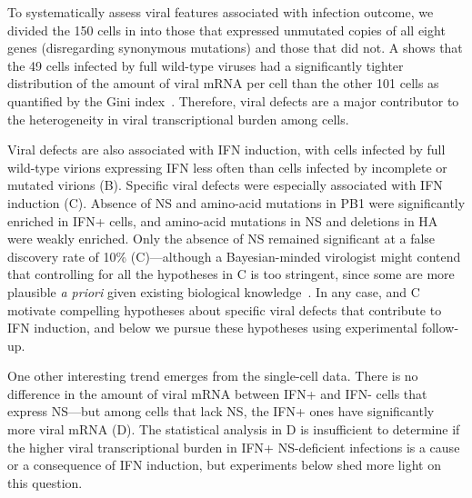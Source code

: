 \documentclass[9pt,lineno]{elife}
\begin{document}
\begin{figure}
\begin{fullwidth}
\label{figdata:mutations}

\end{fullwidth}
\end{figure}

To systematically assess viral features associated with infection outcome, we divided the 150 cells in  into those that expressed unmutated copies of all eight genes (disregarding synonymous mutations) and those that did not.
A shows that the 49 cells infected by full wild-type viruses had a significantly tighter distribution of the amount of viral mRNA per cell than the other 101 cells as quantified by the Gini index~\citep{gini1921measurement}.
Therefore, viral defects are a major contributor to the heterogeneity in viral transcriptional burden among cells.

Viral defects are also associated with IFN induction, with cells infected by full wild-type virions expressing IFN less often than cells infected by incomplete or mutated virions (B).
Specific viral defects were especially associated with IFN induction (C).
Absence of NS and amino-acid mutations in PB1 were significantly enriched in IFN+ cells, and amino-acid mutations in NS and deletions in HA were weakly enriched.
Only the absence of NS remained significant at a false discovery rate of 10\% (C)---although a Bayesian-minded virologist might contend that controlling for all the hypotheses in C is too stringent, since some are more plausible \textit{a priori} given existing biological knowledge~\citep[e.g.,][]{killip2017single, velthuis2018mini, wu2014high}.
In any case,  and C motivate compelling hypotheses about specific viral defects that contribute to IFN induction, and below we pursue these hypotheses using experimental follow-up. 

One other interesting trend emerges from the single-cell data.
There is no difference in the amount of viral mRNA between IFN+ and IFN- cells that express NS---but among cells that lack NS, the IFN+ ones have significantly more viral mRNA (D).
The statistical analysis in D is insufficient to determine if the higher viral transcriptional burden in IFN+ NS-deficient infections is a cause or a consequence of IFN induction, but experiments below shed more light on this question.
\end{document}
